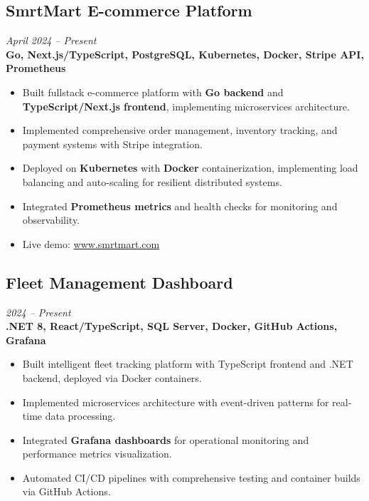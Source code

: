 \documentclass[10pt,a4paper]{article}
\begin{document}
\subsection*{SmrtMart E-commerce Platform}
\textit{April 2024 -- Present} \\
\textbf{Go, Next.js/TypeScript, PostgreSQL, Kubernetes, Docker, Stripe API, Prometheus}
\begin{itemize}[noitemsep]
\item Built fullstack e-commerce platform with \textbf{Go backend} and \textbf{TypeScript/Next.js frontend}, implementing microservices architecture.
\item Implemented comprehensive order management, inventory tracking, and payment systems with Stripe integration.
\item Deployed on \textbf{Kubernetes} with \textbf{Docker} containerization, implementing load balancing and auto-scaling for resilient distributed systems.
\item Integrated \textbf{Prometheus metrics} and health checks for monitoring and observability.
\item Live demo: \href{https://www.smrtmart.com}{www.smrtmart.com}
\end{itemize}

\subsection*{Fleet Management Dashboard}
\textit{2024 -- Present} \\
\textbf{.NET 8, React/TypeScript, SQL Server, Docker, GitHub Actions, Grafana}
\begin{itemize}[noitemsep]
\item Built intelligent fleet tracking platform with TypeScript frontend and .NET backend, deployed via Docker containers.
\item Implemented microservices architecture with event-driven patterns for real-time data processing.
\item Integrated \textbf{Grafana dashboards} for operational monitoring and performance metrics visualization.
\item Automated CI/CD pipelines with comprehensive testing and container builds via GitHub Actions.
\end{itemize}
\end{document}
